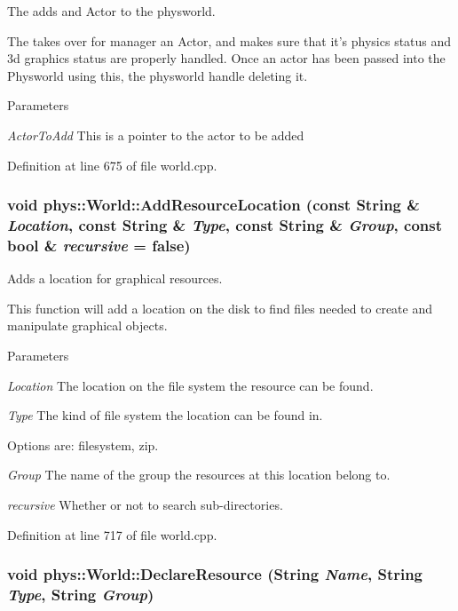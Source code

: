 The adds and Actor to the physworld. 

The takes over for manager an Actor, and makes sure that it's physics status and 3d graphics status are properly handled. Once an actor has been passed into the Physworld using this, the physworld handle deleting it. 
\begin{DoxyParams}{Parameters}
\item[{\em ActorToAdd}]This is a pointer to the actor to be added \end{DoxyParams}


Definition at line 675 of file world.cpp.

\hypertarget{classphys_1_1World_ab26033088abe4d60a40cf770dd1b0de8}{
\subsubsection[{AddResourceLocation}]{\setlength{\rightskip}{0pt plus 5cm}void phys::World::AddResourceLocation (const {\bf String} \& {\em Location}, \/  const {\bf String} \& {\em Type}, \/  const {\bf String} \& {\em Group}, \/  const bool \& {\em recursive} = {\ttfamily false})}}
\label{da/ddf/classphys_1_1World_ab26033088abe4d60a40cf770dd1b0de8}


Adds a location for graphical resources. 

This function will add a location on the disk to find files needed to create and manipulate graphical objects. 
\begin{DoxyParams}{Parameters}
\item[{\em Location}]The location on the file system the resource can be found. \item[{\em Type}]The kind of file system the location can be found in. \par
 Options are: filesystem, zip. \item[{\em Group}]The name of the group the resources at this location belong to. \item[{\em recursive}]Whether or not to search sub-\/directories. \end{DoxyParams}


Definition at line 717 of file world.cpp.

\hypertarget{classphys_1_1World_ad8c9834c1b9a0de437a0b29f17c0c48e}{
\subsubsection[{DeclareResource}]{\setlength{\rightskip}{0pt plus 5cm}void phys::World::DeclareResource ({\bf String} {\em Name}, \/  {\bf String} {\em Type}, \/  {\bf String} {\em Group})}}
\label{da/ddf/classphys_1_1World_ad8c9834c1b9a0de437a0b29f17c0c48e}


